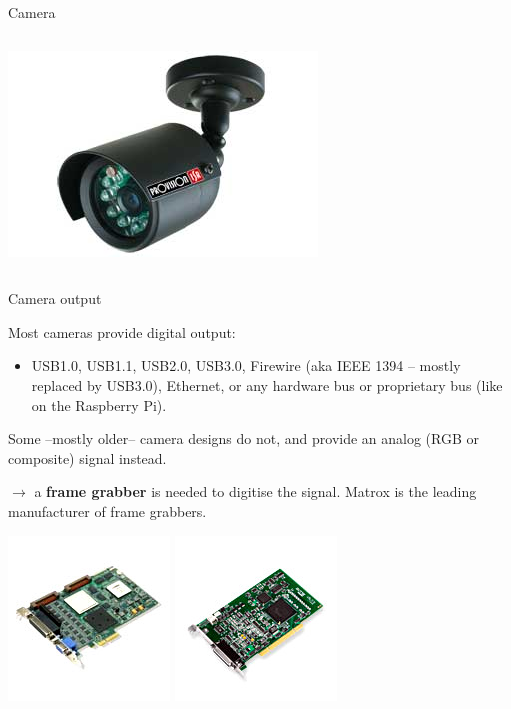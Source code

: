 \documentclass[compress]{beamer}
\begin{document}
\begin{frame}{Camera}
\begin{columns}
\begin{column}{0.5\linewidth}
\begin{center}
                \includegraphics[width=0.6\linewidth]{camera3}
            \end{center}
        \end{column}
    \end{columns}
\end{frame}

\begin{frame}{Camera output}

    Most cameras provide digital output:

    \begin{itemize}

        \item
            USB1.0, USB1.1, USB2.0, USB3.0, Firewire (aka IEEE 1394 -- mostly replaced by USB3.0), Ethernet,
              or any hardware bus or proprietary bus (like on the Raspberry Pi).
    \end{itemize}

    Some --mostly older-- camera designs do not, and provide an analog (RGB
    or composite) signal instead.

    $\rightarrow$ a \textbf{frame grabber} is needed to digitise the signal.
    Matrox is the leading manufacturer of frame grabbers.

    \begin{center}
        \includegraphics[width=0.25\linewidth]{matrox-framegrabber1}
        \includegraphics[width=0.25\linewidth]{matrox-framegrabber2}
    \end{center}

\end{frame}
\end{document}
